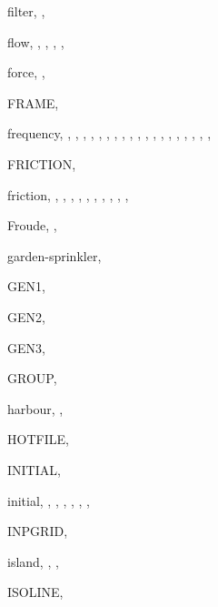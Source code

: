 \documentclass[12pt]{book}
\begin{document}
\begin{theindex}
  \item filter, , 
  \item flow, , , ,
		, 
  \item force, , 
  \item FRAME, 
  \item frequency, , , ,
		, , ,
		, , ,
		, , ,
		, , ,
		, , ,
		, 
  \item FRICTION, 
  \item friction, , ,
		, , ,
		, , ,
		, , 
  \item Froude, , 

  \indexspace

  \item garden-sprinkler, 
  \item GEN1, 
  \item GEN2, 
  \item GEN3, 
  \item GROUP, 

  \indexspace

  \item harbour, , 
  \item HOTFILE, 

  \indexspace

  \item INITIAL, 
  \item initial, , , ,
		, , ,
  \item INPGRID, 
  \item island, , , 
  \item ISOLINE, 

  \indexspace


\end{theindex}
\end{document}
